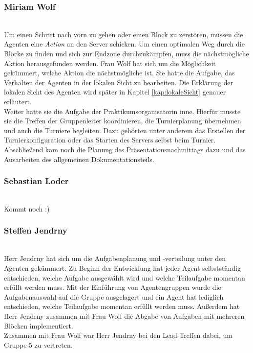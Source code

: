 \subsubsection{Miriam Wolf} ~\\
Um einen Schritt nach vorn zu gehen oder einen Block zu zerstören, müssen die Agenten eine \textit{Action} an den Server schicken. Um einen optimalen Weg durch die Blöcke zu finden und sich zur Endzone durchzukämpfen, muss die nächstmögliche Aktion herausgefunden werden. Frau Wolf hat sich um die Möglichkeit gekümmert, welche Aktion die nächstmögliche ist. Sie hatte die Aufgabe, das Verhalten der Agenten in der lokalen Sicht zu bearbeiten. Die Erklärung der lokalen Sicht des Agenten wird später in Kapitel \ref{kap:lokaleSicht} genauer erläutert. \\

Weiter hatte sie die Aufgabe der Praktikumsorganisatorin inne. Hierfür musste sie die Treffen der Gruppenleiter koordinieren, die Turnierplanung übernehmen und auch die Turniere begleiten. Dazu gehörten unter anderem das Erstellen der Turnierkonfiguration oder das Starten des Servers selbst beim Turnier. Abschließend kam noch die Planung des Präsentationsnachmittags dazu und das Ausarbeiten des allgemeinen Dokumentationsteils.

\subsubsection{Sebastian Loder} ~\\
Kommt noch :)

\subsubsection{Steffen Jendrny} ~\\
Herr Jendrny hat sich um die Aufgabenplanung und -verteilung unter den Agenten gekümmert. Zu Beginn der Entwicklung hat jeder Agent selbstständig entschieden, welche Aufgabe ausgewählt wird und welche Teilaufgabe momentan erfüllt werden muss. Mit der Einführung von Agentengruppen wurde die Aufgabenauswahl auf die Gruppe ausgelagert und ein Agent hat lediglich entschieden, welche Teilaufgabe momentan erfüllt werden muss. Außerdem hat Herr Jendrny zusammen mit Frau Wolf die Abgabe von Aufgaben mit mehreren Blöcken implementiert. \\
Zusammen mit Frau Wolf war Herr Jendrny bei den Lead-Treffen dabei, um Gruppe 5 zu vertreten.